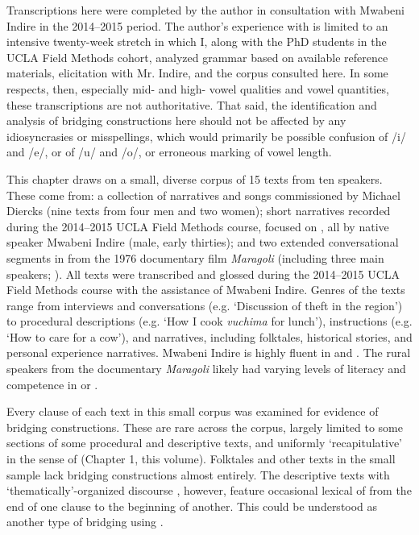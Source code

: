 \documentclass[output=paper]{LSP/langsci}
\begin{document}
Transcriptions here were completed by the author in consultation with Mwabeni Indire in the 2014--2015 period. The author’s experience with  is limited to an intensive twenty-week stretch in which I, along with the PhD students in the UCLA Field Methods cohort, analyzed  grammar based on available reference materials, elicitation with Mr. Indire, and the corpus consulted here. In some respects, then, especially mid- and high- vowel qualities and vowel quantities, these transcriptions are not authoritative. That said, the identification and analysis of bridging constructions here should not be affected by any idiosyncrasies or misspellings, which would primarily be possible confusion of /i/ and /e/, or of /u/ and /o/, or erroneous marking of vowel length. 

This chapter draws on a small, diverse corpus of 15  texts from ten speakers. These come from: a collection of  narratives and songs commissioned by Michael Diercks (nine texts from four men and two women); short narratives recorded during the 2014--2015 UCLA Field Methods course, focused on , all by native speaker Mwabeni Indire (male, early thirties); and two extended conversational segments in  from the 1976 documentary film \textit{Maragoli} (including three main  speakers; \citealt{Nichols1976}). All texts were transcribed and glossed during the 2014--2015 UCLA Field Methods course with the assistance of Mwabeni Indire. Genres of the texts range from interviews and conversations (e.g. `Discussion of theft in the region') to procedural descriptions (e.g. `How I cook \textit{vuchima} for lunch'), instructions (e.g. `How to care for a cow'), and narratives, including folktales, historical stories, and personal experience narratives. Mwabeni Indire is highly fluent in  and . The rural  speakers from the documentary \textit{Maragoli} likely had varying levels of literacy and competence in  or .

Every clause of each text in this small corpus was examined for evidence of bridging constructions. These are rare across the corpus, largely limited to some sections of some procedural and descriptive texts, and uniformly `recapitulative' in the sense of \citeauthor{guerin18} (Chapter 1, this volume). Folktales and other  texts in the small sample lack bridging constructions almost entirely. The descriptive texts with `thematically'-organized discourse \citep{farr99}, however, feature occasional lexical  of  from the end of one clause to the beginning of another. This could be understood as another type of bridging using .
\end{document}
